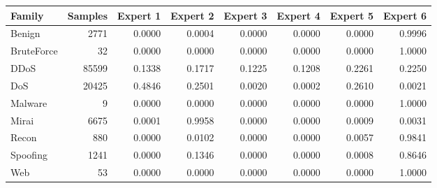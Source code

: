 \begin{tabular}{lrrrrrrr}
\toprule
Family & Samples & Expert 1 & Expert 2 & Expert 3 & Expert 4 & Expert 5 & Expert 6 \\
\midrule
Benign & 2771 & 0.0000 & 0.0004 & 0.0000 & 0.0000 & 0.0000 & 0.9996 \\
BruteForce & 32 & 0.0000 & 0.0000 & 0.0000 & 0.0000 & 0.0000 & 1.0000 \\
DDoS & 85599 & 0.1338 & 0.1717 & 0.1225 & 0.1208 & 0.2261 & 0.2250 \\
DoS & 20425 & 0.4846 & 0.2501 & 0.0020 & 0.0002 & 0.2610 & 0.0021 \\
Malware & 9 & 0.0000 & 0.0000 & 0.0000 & 0.0000 & 0.0000 & 1.0000 \\
Mirai & 6675 & 0.0001 & 0.9958 & 0.0000 & 0.0000 & 0.0009 & 0.0031 \\
Recon & 880 & 0.0000 & 0.0102 & 0.0000 & 0.0000 & 0.0057 & 0.9841 \\
Spoofing & 1241 & 0.0000 & 0.1346 & 0.0000 & 0.0000 & 0.0008 & 0.8646 \\
Web & 53 & 0.0000 & 0.0000 & 0.0000 & 0.0000 & 0.0000 & 1.0000 \\
\bottomrule
\end{tabular}
